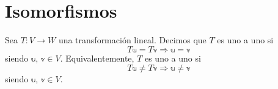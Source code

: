 \newpage

\section{Isomorfismos}

\begin{definition}
    Sea $T:V \longrightarrow W$ una transformación lineal. Decimos que $T$ es uno a uno si
    $$T\mathbb{u} = T\mathbb{v} \Longrightarrow \mathbb{u} = \mathbb{v}$$
    siendo $\mathbb{u}$, $\mathbb{v} \in V$. Equivalentemente, $T$ es uno a uno si
    $$T\mathbb{u} \neq T\mathbb{v} \Longrightarrow \mathbb{u} \neq \mathbb{v}$$
    siendo $\mathbb{u}$, $\mathbb{v} \in V$.
\end{definition}

